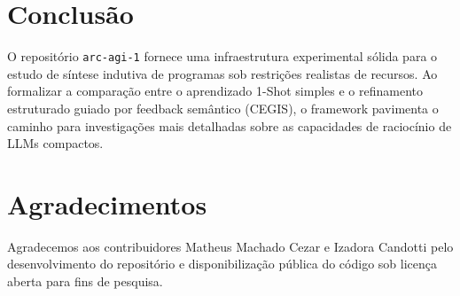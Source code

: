 \documentclass[letterpaper]{article} %
\begin{document}
\section{Conclus{\~a}o}
O reposit{\'o}rio \texttt{arc-agi-1} fornece uma infraestrutura experimental s{\'o}lida para o estudo de s{\'i}ntese indutiva de programas sob restri{\c{c}}{\~o}es realistas de recursos. Ao formalizar a compara{\c{c}}{\~a}o entre o aprendizado 1-Shot simples e o refinamento estruturado guiado por feedback sem{\^a}ntico (CEGIS), o framework pavimenta o caminho para investiga{\c{c}}{\~o}es mais detalhadas sobre as capacidades de racioc{\'i}nio de LLMs compactos.

\section*{Agradecimentos}
Agradecemos aos contribuidores Matheus Machado Cezar e Izadora Candotti pelo desenvolvimento do reposit{\'o}rio e disponibiliza{\c{c}}{\~a}o p{\'u}blica do c{\'o}digo sob licen{\c{c}}a aberta para fins de pesquisa.


\end{document}
